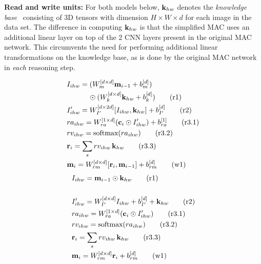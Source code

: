 \noindent\textbf{Read and write units:}
For both models below, $\mathbf{k}_{hw}$ denotes the 
\emph{knowledge base}~\cite{hudson2018compositional}
consisting of 3D tensors with dimension $H \times W \times d$ for each image
in the data set. The difference in computing $\mathbf{k}_{hw}$ is that the simplified MAC uses
an additional linear layer on top of the 2 CNN layers present in the original MAC network.
This circumvents the need for performing additional linear transformations on the 
knowledge base, as is done by the original MAC network in \emph{each} reasoning step.

\begin{multicols}{2}
	\noindent
	\begin{align*}
	&I_{ihw} = (W_{m}^{[d \times d]} \mathbf{m}_{i-1} + b_{m}^{[d]}) \\
	           & \qquad \quad \odot (W_{k}^{[d \times d]} \mathbf{k}_{hw} + b_{k}^{[d]}) \tag{r1} \\
	&I'_{ihw} =  W_{I'}^{[d \times 2d]} [I_{ihw},\mathbf{k}_{hw}]  + b_{I'}^{[d]}  \tag{r2} \\
	&ra_{ihw} = W_{ra}^{[1 \times d]} (\mathbf{c}_i \odot I'_{ihw}) + b_{ra}^{[1]} \tag{r3.1}\\
	&rv_{ihw} = \textrm{softmax}(ra_{ihw}) \tag{r3.2}\\
	&\mathbf{r}_i = \sum_s rv_{ihw} \, \mathbf{k}_{hw}  \tag{r3.3}\\
	&\mathbf{m}_i = W_{rm}^{[d \times d]} [\mathbf{r}_i, \mathbf{m}_{i-1}]  + b_{rm}^{[d]} \tag{w1}	
	\end{align*}
	\columnbreak
	{\color{Plum}
	\begin{align*}
	&I_{ihw} = \mathbf{m}_{i-1} \odot \mathbf{k}_{hw} \tag{r1} \\ \\
	&I'_{ihw} = W_{I'}^{[d \times d]} I_{ihw} + b_{I'}^{[d]} + \mathbf{k}_{hw} \tag{r2} \\
	&ra_{ihw} = W_{ra}^{[1 \times d]} (\mathbf{c}_i \odot I'_{ihw})  \tag{r3.1}\\
	&rv_{ihw} = \textrm{softmax}(ra_{ihw}) \tag{r3.2}\\
	&\mathbf{r}_i = \sum_s rv_{ihw} \, \mathbf{k}_{hw}  \tag{r3.3}\\
	&\mathbf{m}_i = W_{rm}^{[d \times d]} \mathbf{r}_i + b_{rm}^{[d]} \tag{w1}
	\end{align*}}
\end{multicols}

